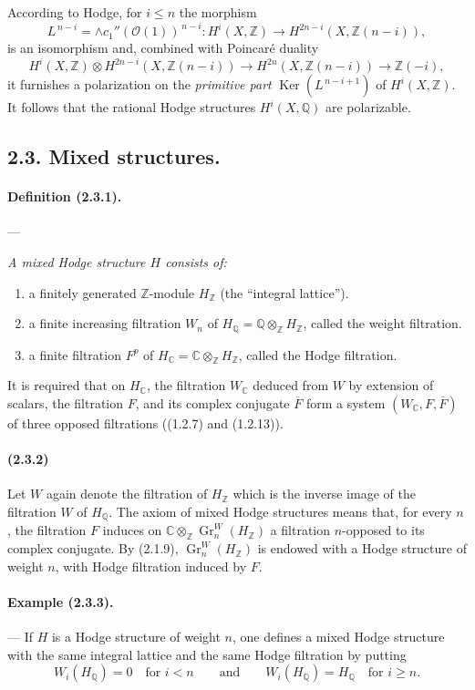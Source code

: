 \documentclass[10pt]{article}
\newcommand{\C}{\mathbb C}
\newcommand{\Q}{\mathbb Q}
\newcommand{\Z}{\mathbb Z}
\newcommand{\Gr}{\operatorname{Gr}}
\newcommand{\Ker}{\operatorname{Ker}}
\providecommand{\cO}{\mathcal O}
\providecommand{\cO}{\mathcal O}
\begin{document}
According to Hodge, for $i\le n$ the morphism
\[
L^{\,n-i}=\wedge c_1''(\cO(1))^{\,n-i}:H^i(X,\Z)\longrightarrow H^{2n-i}(X,\Z(n-i)),
\]
is an isomorphism and, combined with Poincaré duality
\[
H^i(X,\Z)\otimes H^{2n-i}(X,\Z(n-i))\longrightarrow
H^{2n}(X,\Z(n-i))\longrightarrow \Z(-i),
\]
it furnishes a polarization on the \emph{primitive part} $\Ker(L^{\,n-i+1})$ of $H^i(X,\Z)$. It follows that the rational Hodge structures $H^i(X,\Q)$ are polarizable.

\subsection*{2.3. Mixed structures.}

\paragraph{Definition (2.3.1).} --- {\itshape A mixed Hodge structure $H$ consists of:
\begin{enumerate}[label=\alph*)]
\item a finitely generated $\Z$-module $H_\Z$ (the ``integral lattice'').
\item a finite increasing filtration $W_n$ of $H_\Q=\Q\otimes_\Z H_\Z$, called the weight filtration.
\item a finite filtration $F^p$ of $H_\C=\C\otimes_\Z H_\Z$, called the Hodge filtration.
\end{enumerate}
It is required that on $H_\C$, the filtration $W_\C$ deduced from $W$ by extension of scalars, the filtration $F$, and its complex conjugate $\overline F$ form a system $(W_\C,F,\overline F)$ of three opposed filtrations ((1.2.7) and (1.2.13)).}

\paragraph{(2.3.2)} Let $W$ again denote the filtration of $H_\Z$ which is the inverse image of the filtration $W$ of $H_\Q$. The axiom of mixed Hodge structures means that, for every $n$, the filtration $F$ induces on $\C\otimes_\Z\Gr_n^W(H_\Z)$ a filtration $n$-opposed to its complex conjugate. By (2.1.9), $\Gr_n^W(H_\Z)$ is endowed with a Hodge structure of weight $n$, with Hodge filtration induced by $F$.

\paragraph{Example (2.3.3).} --- If $H$ is a Hodge structure of weight $n$, one defines a mixed Hodge structure with the same integral lattice and the same Hodge filtration by putting
\[
W_i(H_\Q)=0\quad\text{for }i<n\qquad\text{and}\qquad
W_i(H_\Q)=H_\Q\quad\text{for }i\ge n.
\]
\end{document}
